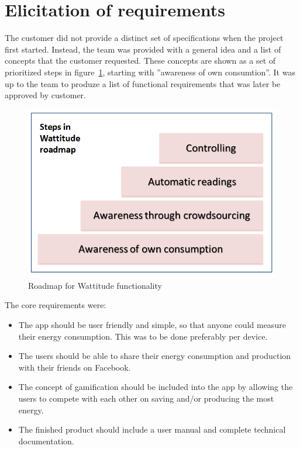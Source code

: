 \section{Elicitation of requirements}
\label{sec:obtainingreq}

The customer did not provide a distinct set of specifications when the project first started. Instead, the team was provided with a general idea and a list of concepts that the customer requested. These concepts are shown as a set of prioritized steps in figure~\ref{fig:roadmap}, starting with ''awareness of own consumtion''. It was up to the team to produze a list of functional requirements that was later be approved by customer.

\begin{figure}[H]
\centering
\includegraphics[height=0.4\textheight]{ch/specification/fig/roadmap.png}
\caption{Roadmap for Wattitude functionality}
\label{fig:roadmap}
\end{figure}

The core requirements were:
\begin{itemize}
\item The app should be user friendly and simple, so that anyone could measure their energy consumption. This was to be done preferably per device. 
\item The users should be able to share their energy consumption and production with their friends on Facebook. 
\item The concept of \gls{gamification} should be included into the app by allowing the users to compete with each other on saving and/or producing the most energy. 
\item The finished product should include a user manual and complete technical documentation.
\end{itemize}

